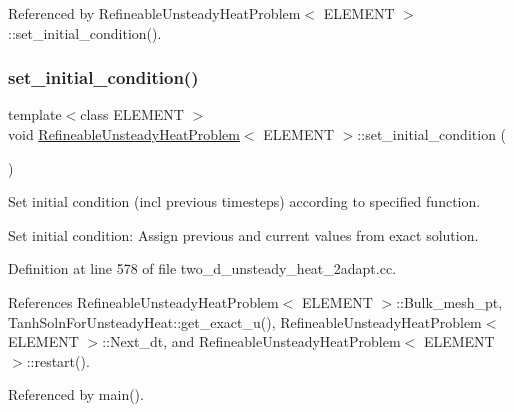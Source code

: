 Referenced by Refineable\+Unsteady\+Heat\+Problem$<$ E\+L\+E\+M\+E\+N\+T $>$\+::set\+\_\+initial\+\_\+condition().

\mbox{\label{classRefineableUnsteadyHeatProblem_a30e2e1d62b059982f7014b74f4fe2be9}} 
\subsubsection{\texorpdfstring{set\+\_\+initial\+\_\+condition()}{set\_initial\_condition()}}
{\footnotesize\ttfamily template$<$class E\+L\+E\+M\+E\+NT $>$ \\
void \hyperlink{classRefineableUnsteadyHeatProblem}{Refineable\+Unsteady\+Heat\+Problem}$<$ E\+L\+E\+M\+E\+NT $>$\+::set\+\_\+initial\+\_\+condition (\begin{DoxyParamCaption}{ }\end{DoxyParamCaption})}



Set initial condition (incl previous timesteps) according to specified function. 

Set initial condition\+: Assign previous and current values from exact solution. 

Definition at line 578 of file two\+\_\+d\+\_\+unsteady\+\_\+heat\+\_\+2adapt.\+cc.



References Refineable\+Unsteady\+Heat\+Problem$<$ E\+L\+E\+M\+E\+N\+T $>$\+::\+Bulk\+\_\+mesh\+\_\+pt, Tanh\+Soln\+For\+Unsteady\+Heat\+::get\+\_\+exact\+\_\+u(), Refineable\+Unsteady\+Heat\+Problem$<$ E\+L\+E\+M\+E\+N\+T $>$\+::\+Next\+\_\+dt, and Refineable\+Unsteady\+Heat\+Problem$<$ E\+L\+E\+M\+E\+N\+T $>$\+::restart().



Referenced by main().

\mbox{\label{classRefineableUnsteadyHeatProblem_a94d7869ed87708a3736a7c42959cbfcc}} 
